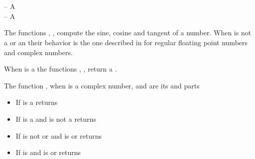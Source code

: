 \documentclass[../Exponentials-Logarithms-Trigonometry.tex]{subfiles}
\begin{document}

\DSyntax{}

  \RArrow {}\\
  \RArrow {}\\
  \RArrow {}

\DArgsNValues{}

 -- A \\
 -- A 

\DDescription{}

The functions , ,  compute the sine, cosine
and tangent of a number. When  is not a  or an
 their behavior is the one described in
\cite{1996:ANSIHyperSpec} for regular floating point numbers and complex
numbers.

\noindent
When  is a  the functions ,
,  return a .

\noindent
The function , when  is a complex number, 
and  are its  and  parts
\begin{itemize}
  \item If  is a  returns 
  \item If  is a  and  is not a
   returns \code{))))}
  \item If  is not  or  and
   is  or  returns
   \code{)} \code{))}
  \item If  is  and  is
   or  returns \code{)}
\end{itemize}
\end{document}
